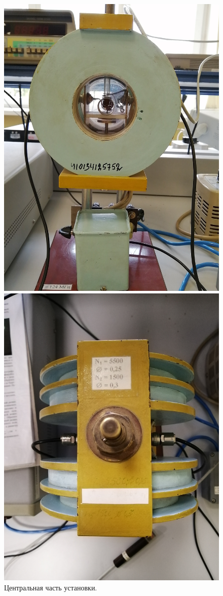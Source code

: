 \documentclass[12pt,a4paper]{article}
\begin{document}
	\begin{figure}[H]
		\centering
		\begin{minipage}{0.5\textwidth}
			\centering
			\includegraphics[width=0.7\linewidth]{photos/coil_front.jpg}
		\end{minipage}%
		\begin{minipage}{0.5\textwidth}
			\centering
			\includegraphics[width=0.7\linewidth]{photos/coil_top.jpg}
		\end{minipage}
		\caption{Центральная часть установки.}
		\label{fig:coil}
	\end{figure}
	
\end{document}
